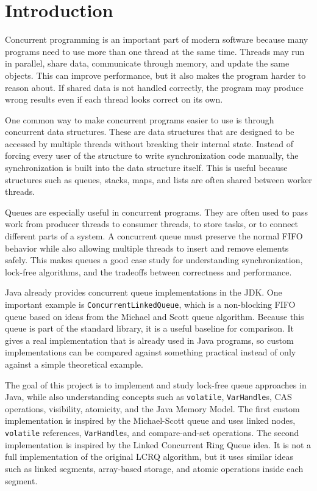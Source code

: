 \section{Introduction}
Concurrent programming is an important part of modern software because many programs need to use more than one thread at the same time. Threads may run in parallel, share data, communicate through memory, and update the same objects. This can improve performance, but it also makes the program harder to reason about. If shared data is not handled correctly, the program may produce wrong results even if each thread looks correct on its own.

One common way to make concurrent programs easier to use is through concurrent data structures. These are data structures that are designed to be accessed by multiple threads without breaking their internal state. Instead of forcing every user of the structure to write synchronization code manually, the synchronization is built into the data structure itself. This is useful because structures such as queues, stacks, maps, and lists are often shared between worker threads.

Queues are especially useful in concurrent programs. They are often used to pass work from producer threads to consumer threads, to store tasks, or to connect different parts of a system. A concurrent queue must preserve the normal FIFO behavior while also allowing multiple threads to insert and remove elements safely. This makes queues a good case study for understanding synchronization, lock-free algorithms, and the tradeoffs between correctness and performance.

Java already provides concurrent queue implementations in the JDK. One important example is \texttt{ConcurrentLinkedQueue}, which is a non-blocking FIFO queue based on ideas from the Michael and Scott queue algorithm. Because this queue is part of the standard library, it is a useful baseline for comparison. It gives a real implementation that is already used in Java programs, so custom implementations can be compared against something practical instead of only against a simple theoretical example.

The goal of this project is to implement and study lock-free queue approaches in Java, while also understanding concepts such as \texttt{volatile}, \texttt{VarHandle}s, CAS operations, visibility, atomicity, and the Java Memory Model. The first custom implementation is inspired by the Michael-Scott queue and uses linked nodes, \texttt{volatile} references, \texttt{VarHandle}s, and compare-and-set operations. The second implementation is inspired by the Linked Concurrent Ring Queue idea. It is not a full implementation of the original LCRQ algorithm, but it uses similar ideas such as linked segments, array-based storage, and atomic operations inside each segment.

